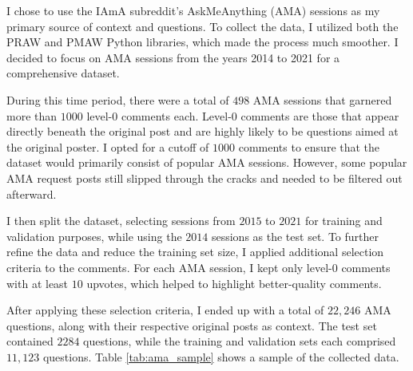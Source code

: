 \documentclass[paper=a4, fontsize=11pt]{scrartcl}
\numberwithin{equation}{section}		%
\numberwithin{figure}{section}			%
\numberwithin{table}{section}				%
\begin{document}
I chose to use the IAmA subreddit's AskMeAnything (AMA) sessions as my primary source of context and questions. To collect the data, I utilized both the PRAW and PMAW Python libraries, which made the process much smoother. I decided to focus on AMA sessions from the years 2014 to 2021 for a comprehensive dataset.

During this time period, there were a total of $498$ AMA sessions that garnered more than $1000$ level-0 comments each. Level-0 comments are those that appear directly beneath the original post and are highly likely to be questions aimed at the original poster. I opted for a cutoff of $1000$ comments to ensure that the dataset would primarily consist of popular AMA sessions. However, some popular AMA request posts still slipped through the cracks and needed to be filtered out afterward.

I then split the dataset, selecting sessions from $2015$ to $2021$ for training and validation purposes, while using the $2014$ sessions as the test set. To further refine the data and reduce the training set size, I applied additional selection criteria to the comments. For each AMA session, I kept only level-0 comments with at least $10$ upvotes, which helped to highlight better-quality comments.

After applying these selection criteria, I ended up with a total of $22,246$ AMA questions, along with their respective original posts as context. The test set contained $2284$ questions, while the training and validation sets each comprised $11,123$ questions.
Table \ref{tab:ama_sample} shows a sample of the collected data.
\end{document}
